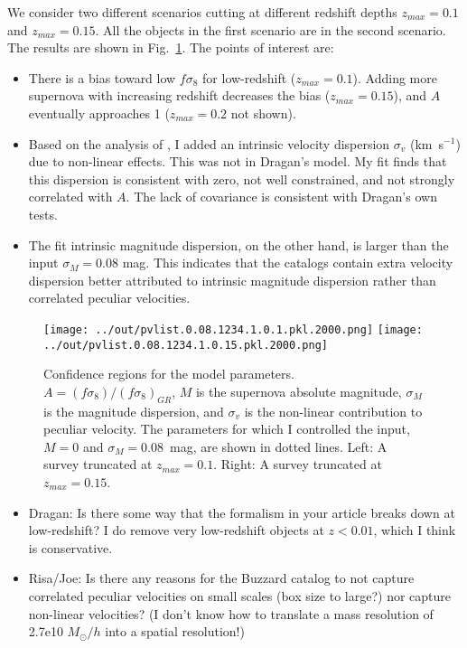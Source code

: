 \documentclass{aastex62}   	%
\begin{document}
We consider two different scenarios cutting at different redshift depths $z_{max}=0.1$ and  $z_{max}=0.15$.  All the objects in the first
scenario are in the second scenario.  The results are shown in Fig.~\ref{zmax:fig}.  The points of interest are:
\begin{itemize}
\item There is a bias toward low $f\sigma_8$ for low-redshift ($z_{max}=0.1$).  Adding more supernova with increasing redshift
 decreases the bias  ($z_{max}=0.15$), and $A$ eventually approaches 1 ($z_{max}=0.2$ not shown).
 \item Based on the analysis of \citet{2017MNRAS.471.3135H}, I added an intrinsic velocity dispersion $\sigma_v$ (km~s$^{-1}$) due to non-linear effects.  This was not
 in Dragan's model.  My fit finds that this  dispersion is consistent with zero, not well constrained, and not strongly correlated with
 $A$.  The lack of covariance is consistent with Dragan's own tests.
 \item The fit intrinsic magnitude dispersion, on the other hand, is larger than the input $\sigma_M=0.08$ mag.  This  indicates that the catalogs
 contain 
 extra  velocity dispersion better attributed to intrinsic magnitude dispersion rather than correlated peculiar velocities.
\end{itemize}


\begin{figure}
\texttt{[image: ../out/pvlist.0.08.1234.1.0.1.pkl.2000.png]}
\texttt{[image: ../out/pvlist.0.08.1234.1.0.15.pkl.2000.png]}
\caption{Confidence regions for the model parameters.  $A=(f\sigma_8)/(f\sigma_8)_{GR}$, $M$ is the supernova
absolute magnitude, $\sigma_M$ is the magnitude dispersion, and $\sigma_v$ is the non-linear contribution
to peculiar velocity.   The parameters for which I controlled the input, $M=0$ and $\sigma_M=0.08$~mag, are shown in dotted lines.
 Left: A survey truncated at $z_{max}=0.1$.  Right: A survey truncated at $z_{max}=0.15$.
\label{zmax:fig}}
\end{figure}

\begin{itemize}
\item Dragan: Is there some way that the formalism in your article breaks down at low-redshift?  I do remove very low-redshift objects at $z<0.01$,
which I think is conservative.
 \item Risa/Joe: Is there any reasons for the Buzzard catalog to not capture correlated peculiar velocities on small scales (box size to large?) nor capture
 non-linear velocities?  (I don't know how to translate a mass resolution of 2.7e10 $M_{\odot}/h$ into a spatial resolution!)
\end{itemize}



\end{document}
